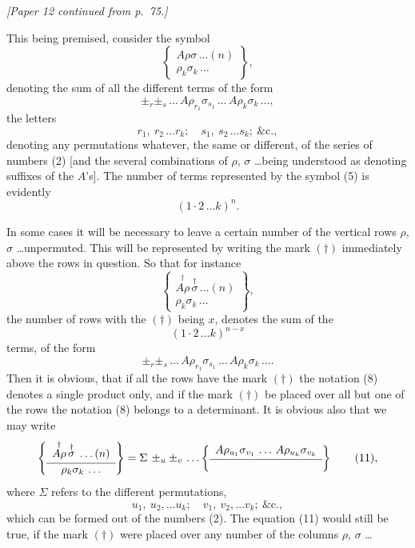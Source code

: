\documentclass[11pt,a4paper]{article}
\theoremstyle{plain}
\theoremstyle{definition}
\theoremstyle{remark}
\begin{document}
\setlength{\parindent}{1.5em}
\setlength{\parskip}{0pt}
\thispagestyle{empty}
\newpage
\setcounter{page}{76}


\noindent\textit{[Paper 12 continued from p.~75.]}

\vspace{6pt}

This being premised, consider the symbol
\[
\left\{
\begin{array}{c}
A\rho\sigma\,\ldots(n) \\[2pt]
\hline
\rho_k\sigma_k\,\ldots
\end{array}
\right\}
\tag{4},
\]
denoting the sum of all the different terms of the form
\[
\pm_r\pm_s\,\ldots\,A\rho_{r_1}\sigma_{s_1}\,\ldots\,A\rho_k\sigma_k\,\ldots
\tag{5},
\]
the letters
\[
r_1,\ r_2\,\ldots r_k;\quad s_1,\ s_2\,\ldots s_k;\ \&\text{c.}
\tag{6},
\]
denoting any permutations whatever, the same or different, of the series of numbers
(2) [and the several combinations of $\rho$, $\sigma$ \ldots being understood as denoting suffixes of
the $A$'s]. The number of terms represented by the symbol (5) is evidently
\[
(1\cdot 2\,\ldots k)^n \tag{7}.
\]

In some cases it will be necessary to leave a certain number of the vertical
rows $\rho$, $\sigma$ \ldots unpermuted. This will be represented by writing the mark $(\dagger)$ immediately
above the rows in question. So that for instance
\[
\left\{
\begin{array}{c}
\stackrel{\dagger}{A\rho}\,\stackrel{\dagger}{\sigma}\,\ldots(n) \\[2pt]
\hline
\rho_k\sigma_k\,\ldots
\end{array}
\right\}
\tag{8},
\]
the number of rows with the $(\dagger)$ being $x$, denotes the sum of the
\[
(1\cdot 2\,\ldots k)^{n-x} \tag{9}
\]
terms, of the form
\[
\pm_r\pm_s\,\ldots\,A\rho_{r_1}\sigma_{s_1}\,\ldots\,A\rho_k\sigma_k\,\ldots
\tag{10}.
\]
Then it is obvious, that if all the rows have the mark $(\dagger)$ the notation (8) denotes
a single product only, and if the mark $(\dagger)$ be placed over all but one of the rows
the notation (8) belongs to a determinant. It is obvious also that we may write
\[
\left\{
\begin{array}{c}
\stackrel{\dagger}{A\rho}\,\stackrel{\dagger}{\sigma}\,\ldots(n) \\[2pt]
\hline
\rho_k\sigma_k\,\ldots
\end{array}
\right\}
= \Sigma\,\pm_u\pm_v\,\ldots
\left\{
\begin{array}{c}
A\rho_{u_1}\sigma_{v_1}\,\ldots\,A\rho_{u_k}\sigma_{v_k} \\[2pt]
\hline
\\
\end{array}
\right\}
\tag{11},
\]
where $\Sigma$ refers to the different permutations,
\[
u_1,\ u_2,\ldots u_k;\quad v_1,\ v_2,\ldots v_k;\ \&\text{c.}
\tag{12},
\]
which can be formed out of the numbers (2). The equation (11) would still be true,
if the mark $(\dagger)$ were placed over any number of the columns $\rho$, $\sigma$ \ldots
\end{document}
